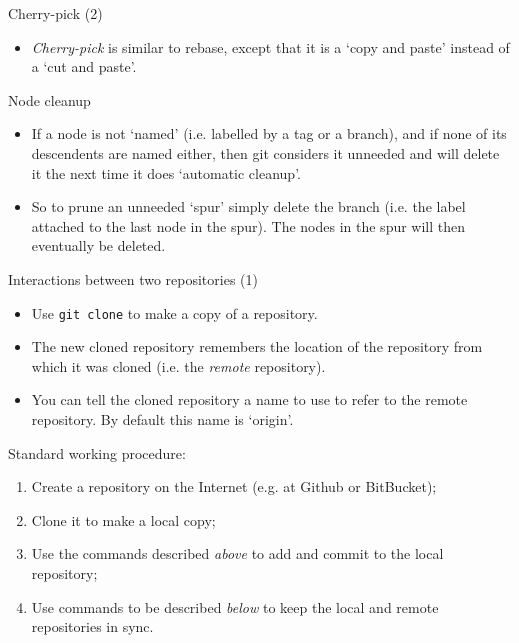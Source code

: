 \documentclass[usenames,dvipsnames]{beamer}
\newcommand{\code}[1]{\colorbox{light-gray}{\texttt{#1}}}
\begin{document}
\begin{frame}{Cherry-pick (2)}
  \begin{block}{}
    \begin{itemize}
      \item{\textit{Cherry-pick} is similar to rebase, except that it is a `copy and paste' instead of a `cut and paste'.}
    \end{itemize}
  \end{block}
\end{frame}


\begin{frame}{Node cleanup}
  \begin{block}{}
    \begin{itemize}
      \item{If a node is not `named' (i.e. labelled by a tag or a branch), and if none of its descendents are named either, then git considers it unneeded and will delete it the next time it does `automatic cleanup'.}
      \item{So to prune an unneeded `spur' simply delete the branch (i.e. the label attached to the last node in the spur). The nodes in the spur will then eventually be deleted.}
    \end{itemize}
  \end{block}
\end{frame}

\begin{frame}{Interactions between two repositories (1)}
  \begin{block}{}
    \begin{itemize}
      \item{Use \code{git clone} to make a copy of a repository.}
      \item{The new cloned repository remembers the location of the repository from which it was cloned (i.e. the \textit{remote} repository).}
      \item{You can tell the cloned repository a name to use to refer to the remote repository. By default this name is `origin'.}
    \end{itemize}
  \end{block}
\end{frame}

\begin{frame}{Standard working procedure:}
  \begin{block}{}
    \begin{enumerate}
      \item{Create a repository on the Internet (e.g. at Github or BitBucket);}
      \item{Clone it to make a local copy;}
      \item{Use the commands described \textit{above} to add and commit to the local repository;}
      \item{Use commands to be described \textit{below} to keep the local and remote repositories in sync.}
    \end{enumerate}
  \end{block}
\end{frame}
\end{document}
